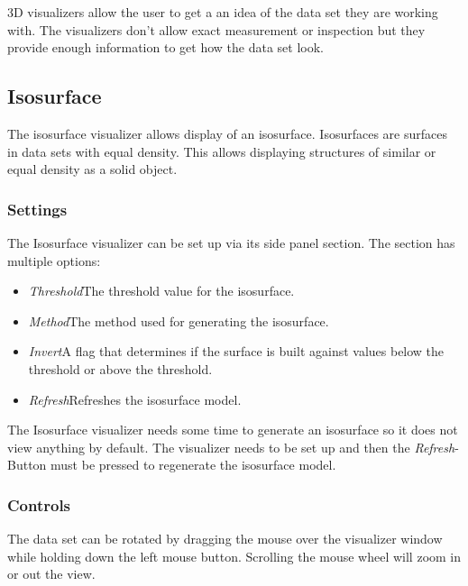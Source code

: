 
3D visualizers allow the user to get a an idea of the data set they are working with.
The visualizers don't allow exact measurement or inspection but they provide enough
information to get how the data set look.

\subsection{Isosurface}

The isosurface visualizer allows display of an isosurface. Isosurfaces are
surfaces in data sets with equal density. This allows displaying structures of
similar or equal density as a solid object.

\subsubsection{Settings}
The Isosurface visualizer can be set up via its side panel section.
The section has multiple options:
\begin{itemize}
	\item{\emph{Threshold}\newline The threshold value for the isosurface.}
	\item{\emph{Method}\newline The method used for generating the isosurface.}
	\item{\emph{Invert}\newline A flag that determines if the surface is built
		against values below the threshold or above the threshold.}
	\item{\emph{Refresh}\newline Refreshes the isosurface model.}
\end{itemize}
The Isosurface visualizer needs some time to generate an isosurface so it does not
view anything by default.
The visualizer needs to be set up and then the \emph{Refresh}-Button must be pressed
to regenerate the isosurface model.

\subsubsection{Controls}
The data set can be rotated by dragging the mouse over the visualizer window while
holding down the left mouse button.
Scrolling the mouse wheel will zoom in or out the view.

